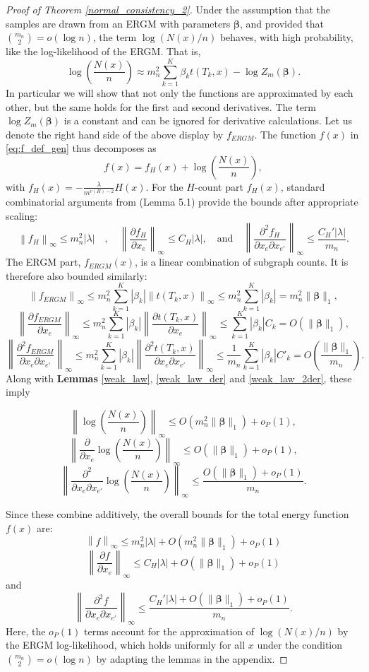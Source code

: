 \documentclass[12pt]{article}
\numberwithin{equation}{section}
\def\bbeta{\boldsymbol{\beta}}
\begin{document}
\begin{proof}[Proof of Theorem \ref{normal_consistency_2}]
Under the assumption that the samples are drawn from an ERGM with parameters $\bbeta$, and provided that $\binom{m_n}{2} = o(\log n)$, the term $\log(N(x)/n)$ behaves, with high probability, like the log-likelihood of the ERGM. That is,
\[
\log\left(\frac{N(x)}{n}\right) \approx m_n^2\sum_{k=1}^K \beta_k t(T_k,x) - \log Z_m(\bbeta).
\]
In particular we will show that not only the functions are approximated by each other, but the same holds for the first and second derivatives. 
The term $\log Z_m(\bbeta)$ is a constant and can be ignored for derivative calculations. Let us denote the right hand side of the above display by $f_{ERGM}$. The function $f(x)$ in \eqref{eq:f_def_gen} thus decomposes as
\[
f(x) = f_H(x) + \log\left(\frac{N(x)}{n}\right),
\]
with
\(
f_H(x)=-\frac{\lambda}{m^{v(H)-2}}H(x) 
\). For the \(H\)-count part \(f_H(x)\), standard combinatorial arguments from \cite{chatterjee2016nonlinear} (Lemma 5.1) provide the bounds after appropriate scaling:
\[
\left\|f_H\right\|_\infty \leq m_n^2 \lvert \lambda\rvert \quad, \quad \left\|\frac{\partial f_H}{\partial x_e}\right\|_\infty \le C_H|\lambda|, \quad \text{and} \quad \left\|\frac{\partial^2 f_H}{\partial x_e\partial x_{e'}}\right\|_\infty \le  \frac{C_H'|\lambda|}{m_n}.
\]
The ERGM part, $f_{ERGM}(x)$, is a linear combination of subgraph counts. It is therefore also bounded similarly:
\[
\left\|f_{ERGM}\right\|_\infty \le m_n^2\sum_{k=1}^K |\beta_k| \left\|t(T_k,x)\right\|_\infty \le m_n^2\sum_{k=1}^K |\beta_k| = m_n^2\|\bbeta\|_1,
\]
\[
\left\|\frac{\partial f_{ERGM}}{\partial x_e}\right\|_\infty \le m_n^2\sum_{k=1}^K |\beta_k| \left\|\frac{\partial t(T_k,x)}{\partial x_e}\right\|_\infty \le \sum_{k=1}^K |\beta_k| C_k = O(\|\bbeta\|_1),
\]
\[
\left\|\frac{\partial^2 f_{ERGM}}{\partial x_e \partial x_{e'}}\right\|_\infty \le m_n^2\sum_{k=1}^K |\beta_k| \left\|\frac{\partial^2 t(T_k,x)}{\partial x_e \partial x_{e'}}\right\|_\infty \le \frac{1}{m_n}\sum_{k=1}^K |\beta_k| C'_k = O\left(\frac{\|\bbeta\|_1}{m_n}\right).
\]
Along with \textbf{Lemmas} \ref{weak_law}, \ref{weak_law_der} and \ref{weak_law_2der}, these imply

\[
\left\|\log\left(\frac{N(x)}{n}\right)\right\|_\infty \le O(m_n^2\|\bbeta\|_1) + o_P(1),
\]
\[
\left\|\frac{\partial}{\partial x_e}\log\left(\frac{N(x)}{n}\right)\right\|_\infty \le O(\|\bbeta\|_1) + o_P(1),
\]
\[
\left\|\frac{\partial^2}{\partial x_e \partial x_{e'}}\log\left(\frac{N(x)}{n}\right)\right\|_\infty \le  \frac{O(\|\bbeta\|_1)+o_P(1)}{m_n}.
\]

Since these combine additively, the overall bounds for the total energy function \(f(x)\) are:
\[
\left\|f\right\|_\infty \le m_n^2|\lambda| + O(m_n^2\|\bbeta\|_1) + o_P(1)
\]
\[
\left\|\frac{\partial f}{\partial x_e}\right\|_\infty \le C_H|\lambda| + O(\|\bbeta\|_1) + o_P(1)
\]
and
\[
\left\|\frac{\partial^2 f}{\partial x_e\partial x_{e'}}\right\|_\infty \le \frac{C_H'|\lambda| + O(\|\bbeta\|_1)+ o_P(1)}{m_n} .
\]
Here, the $o_P(1)$ terms account for the approximation of $\log(N(x)/n)$ by the ERGM log-likelihood, which holds uniformly for all $x$ under the condition $\binom{m_n}{2}=o(\log n)$ by adapting the lemmas in the appendix.


\end{proof}
\end{document}
